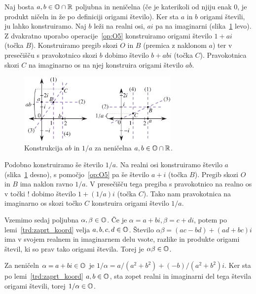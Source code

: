 \begin{dokaz}
    Naj bosta $a, b \in \mathbb O \cap \mathbb R$ poljubna in neničelna (če je katerikoli od njiju enak $0$, je produkt ničeln in že po definiciji origami število). Ker sta $a$ in $b$ origami števili, ju lahko konstruiramo. Naj $b$ leži na realni osi, $ai$ pa na imaginarni (slika~\ref{fig:mnozenje_deljenje} levo). Z dvakratno uporabo operacije~\ref{op:O5} konstruiramo origami število $1 + ai$ (točka $B$). Konstruiramo pregib skozi $O$ in $B$ (premica z naklonom $a$) ter v presečišču s pravokotnico skozi $b$ dobimo število $b + abi$ (točka $C$). Pravokotnica skozi $C$ na imaginarno os na njej konstruira origami število $ab$.

    \begin{figure}[h]
        \centering
        \includegraphics[width=0.7\textwidth]{images/algebra/mnozenje_deljenje.png}
        \caption[Množenje in obratna vrednost realnih origami števil]{Konstrukcija $ab$ in $1/a$ za neničelna $a, b \in \mathbb O \cap \mathbb R$.}
        \label{fig:mnozenje_deljenje}
    \end{figure}

    Podobno konstruiramo še število $1/a$. Na realni osi konstruiramo število $a$ (slika~\ref{fig:mnozenje_deljenje} desno), s pomočjo~\ref{op:O5} pa še število $a + i$ (točka $B$). Pregib skozi $O$ in $B$ ima naklon ravno $1/a$. V presečišču tega pregiba s pravokotnico na realno os v točki $!$ dobimo število $1 + (1/a) i$ (točka $C$). Tako nam pravokotnica na imaginarno os skozi točko $C$ konstruira origami število $1/a$.

    Vzemimo sedaj poljubna $\alpha, \beta \in \mathbb O$. Če je $\alpha = a + bi, \beta = c + di$, potem po lemi~\ref{trd:zaprt_koord} velja $a, b, c, d \in \mathbb O$. Število $\alpha \beta = (ac - bd) + (ad + bc)i$ ima v svojem realnem in imaginarnem delu vsote, razlike in produkte origami števil, ki so prav tako origami števila. Torej je $\alpha \beta \in \mathbb O$.

    Za neničeln $\alpha = a + bi \in \mathbb O$ je $1/\alpha = a/(a^2+b^2) + (-b)/(a^2+b^2)i$. Ker sta po lemi~\ref{trd:zaprt_koord} $a, b \in \mathbb O$, sta zopet realni in imaginarni del tega števila origami števili, torej $1/\alpha \in \mathbb O$.
\end{dokaz}

